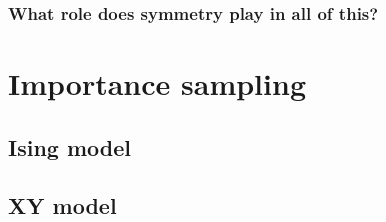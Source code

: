 \subsubsection{What role does symmetry play in all of this?}

\section{Importance sampling}

\subsection{Ising model}

\subsection{XY model}

